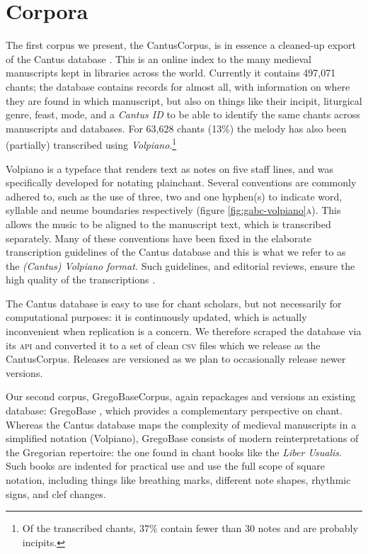 \documentclass[sigconf,screen]{acmart}
\begin{document}
\section{Corpora}


The first corpus we present, the CantusCorpus, is in essence a cleaned-up export of the Cantus database \cite{Cantus}.
This is an online index to the many medieval manuscripts kept in libraries across the world.
Currently it contains 497,071 chants; the database contains records for almost all, with information on where they are found in which manuscript, but also on things like their incipit, liturgical genre, feast, mode, and a \emph{Cantus ID} to be able to identify the same chants across manuscripts and databases.
For 63,628 chants (13\%) the melody has also been (partially) transcribed using \emph{Volpiano}.\footnote{%
    Of the transcribed chants, 37\% contain fewer than 30 notes and are probably incipits.}


Volpiano is a typeface that renders text as notes on five staff lines, and was specifically developed for notating plainchant.
Several conventions are commonly adhered to, such as the use of three, two and one hyphen(s) to indicate word, syllable and neume boundaries respectively (figure \ref{fig:gabc-volpiano}\textsc{a}).
This allows the music to be aligned to the manuscript text, which is transcribed separately.
Many of these conventions have been fixed in the elaborate transcription guidelines of the Cantus database and this is what we refer to as the \emph{(Cantus) Volpiano format.}
Such guidelines, and editorial reviews, ensure the high quality of the transcriptions \cite{Helsen2011}.


The Cantus database is easy to use for chant scholars, but not necessarily for computational purposes: 
it is continuously updated, which is actually inconvenient when replication is a concern.
We therefore scraped the database via its \textsc{api} and converted it to a set of clean \textsc{csv} files which we release as the CantusCorpus.
Releases are versioned as we plan to occasionally release newer versions.


Our second corpus, GregoBaseCorpus, again repackages and versions an existing database: GregoBase \cite{Gregobase}, which provides a complementary perspective on chant.
Whereas the Cantus database maps the complexity of medieval manuscripts in a simplified notation (Volpiano),
GregoBase consists of modern reinterpretations of the Gregorian repertoire: the one found in chant books like the \emph{Liber Usualis}.
Such books are indented for practical use and use the full scope of square notation, including things like breathing marks, different note shapes, rhythmic signs, and clef changes.
\end{document}
